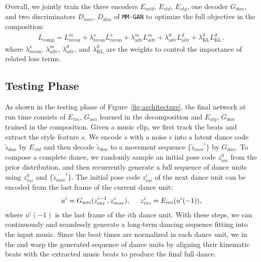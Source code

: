 \documentclass{article}
\newlength\secmargin
\newlength\subsecmargin
\newcommand{\figref}[1]{Figure~\ref{fig:#1}}
\begin{document}
Overall, we jointly train the three encoders $E_{mtd}$, $E_{std}$, $E_{sty}$, one decoder $G_{dan}$, and two discriminators $D_{mov}$, $D_{dan}$ of \texttt{MM-GAN} to optimize the full objective in the composition: 
\begin{align}
L_{\mathrm{comp}} = L^m_{\mathrm{recon}} + \lambda^s_{\mathrm{recon}}L^s_{\mathrm{recon}} + \lambda^m_{\mathrm{adv}}L^m_{\mathrm{adv}} + \lambda^d_{\mathrm{adv}}L^d_{\mathrm{adv}} + 
\lambda^d_{\mathrm{KL}}L^d_{\mathrm{KL}},
\end{align}
where $\lambda^s_{\mathrm{recon}}$,  $\lambda^m_{\mathrm{adv}}$, $\lambda^d_{\mathrm{adv}}$, and
$\lambda^d_{\mathrm{KL}}$ are the weights to control the importance of related loss terms. 

\subsection{Testing Phase}
\label{subsec:test}
\vspace{\subsecmargin}
As shown in the testing phase of \figref{architecture}, the final network at run time consists of $E_{ini}$, $G_{uni}$ learned in the decomposition and $E_{sty}$, $G_{dan}$ trained in the composition. 
Given a music clip, we first track the beats and extract the style feature $s$. 
We encode $s$ with a noise $\epsilon$ into a latent dance code $\tilde{z}_{dan}$ by $E_{std}$ and then decode $\tilde{z}_{dan}$ to a movement sequence $\{{\tilde{z}_{mov}}^i\}$ by $G_{dan}$. 
To compose a complete dance, we randomly sample an initial pose code $z^0_{ini}$ from the prior distribution, and then recurrently generate a full sequence of dance units using $z^0_{ini}$ and $\{{\tilde{z}_{mov}}^i\}$. 
The initial pose code $z^i_{ini}$ of the next dance unit can be encoded from the last frame of the current dance unit:  
\begin{align}
u^i = G_{uni}(z_{ini}^{i-1}, z_{mov}^i), \hspace{5mm} z_{ini}^i = E_{ini}(u^i(-1)),
\end{align}
where $u^i(-1)$ is the last frame of the $i$th dance unit. 
With these steps, we can continuously and seamlessly generate a long-term dancing sequence fitting into the input music. 
Since the beat times are normalized in each dance unit, we in the end warp the generated sequence of dance units by aligning their kinematic beats with the extracted music beats  to produce the final full dance.
\end{document}
